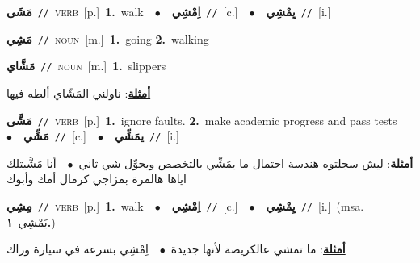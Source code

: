 \documentclass[10pt,a4paper,twoside]{article} %
\begin{document}
\begin{multicols}{2}
{\setlength\topsep{0pt}\textbf{\foreignlanguage{arabic}{مَشَى}}\ {\color{gray}\texttt{//}\color{black}}\ \textsc{verb}\ [p.]\ \textbf{1.}~walk\ \ $\bullet$\ \ \setlength\topsep{0pt}\textbf{\foreignlanguage{arabic}{اِمْشِي}}\ {\color{gray}\texttt{//}\color{black}}\ [c.]\ \ $\bullet$\ \ \setlength\topsep{0pt}\textbf{\foreignlanguage{arabic}{يِمْشِي}}\ {\color{gray}\texttt{//}\color{black}}\ [i.]\ } \vspace{2mm}

{\setlength\topsep{0pt}\textbf{\foreignlanguage{arabic}{مَشِي}}\ {\color{gray}\texttt{//}\color{black}}\ \textsc{noun}\ [m.]\ \textbf{1.}~going  \textbf{2.}~walking\ } \vspace{2mm}

{\setlength\topsep{0pt}\textbf{\foreignlanguage{arabic}{مَشَّاي}}\ {\color{gray}\texttt{//}\color{black}}\ \textsc{noun}\ [m.]\ \textbf{1.}~slippers\  \begin{flushright}\color{gray}\foreignlanguage{arabic}{\textbf{\underline{\foreignlanguage{arabic}{أمثلة}}}: ناولني المَشّاي ألطه فيها}\end{flushright}\color{black}} \vspace{2mm}

{\setlength\topsep{0pt}\textbf{\foreignlanguage{arabic}{مَشَّى}}\ {\color{gray}\texttt{//}\color{black}}\ \textsc{verb}\ [p.]\ \textbf{1.}~ignore faults.  \textbf{2.}~make academic progress and pass tests\ \ $\bullet$\ \ \setlength\topsep{0pt}\textbf{\foreignlanguage{arabic}{مَشِّي}}\ {\color{gray}\texttt{//}\color{black}}\ [c.]\ \ $\bullet$\ \ \setlength\topsep{0pt}\textbf{\foreignlanguage{arabic}{يمَشِّي}}\ {\color{gray}\texttt{//}\color{black}}\ [i.]\  \begin{flushright}\color{gray}\foreignlanguage{arabic}{\textbf{\underline{\foreignlanguage{arabic}{أمثلة}}}: ليش سجلتوه هندسة احتمال ما يمَشِّي بالتخصص ويحوِّل شي ثاني\ $\bullet$\ \  أنا مَشَّيتلك اياها هالمرة بمزاجي كرمال أمك وأبوك}\end{flushright}\color{black}} \vspace{2mm}

{\setlength\topsep{0pt}\textbf{\foreignlanguage{arabic}{مِشِي}}\ {\color{gray}\texttt{//}\color{black}}\ \textsc{verb}\ [p.]\ \textbf{1.}~walk\ \ $\bullet$\ \ \setlength\topsep{0pt}\textbf{\foreignlanguage{arabic}{اِمْشِي}}\ {\color{gray}\texttt{//}\color{black}}\ [c.]\ \ $\bullet$\ \ \setlength\topsep{0pt}\textbf{\foreignlanguage{arabic}{يِمْشِي}}\ {\color{gray}\texttt{//}\color{black}}\ [i.]\ \color{gray}(msa. \foreignlanguage{arabic}{يَمْشِي}~\foreignlanguage{arabic}{\textbf{١.}})\color{black}\  \begin{flushright}\color{gray}\foreignlanguage{arabic}{\textbf{\underline{\foreignlanguage{arabic}{أمثلة}}}: ما تمشي عالكريصة لأنها جديدة\ $\bullet$\ \  اِمْشِي بسرعة في سيارة وراك}\end{flushright}\color{black}} \vspace{2mm}


\end{multicols}
\end{document}
